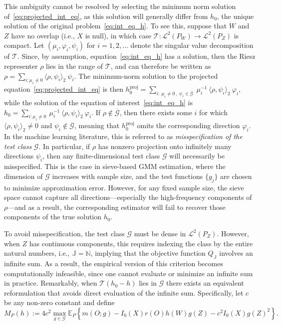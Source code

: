 \documentclass[twoside,11pt]{article}
\newcommand{\mc}{\mathcal}
\begin{document}
This ambiguity cannot be resolved by selecting the minimum norm solution of~\eqref{eq:projected_int_eq}, as this solution will generally differ from $h_0$, the unique solution of the original problem~\eqref{eq:int_eq_h}. To see this, suppose that $W$ and $Z$ have no overlap (i.e., $X$ is null), in which case $\mathcal{T}:\mc{L}^2(P_W) \rightarrow \mc{L}^2(P_Z)$ is compact. Let $(\mu_i, \varphi_i, \psi_i)$ for $i = 1, 2, \dots$ denote the singular value decomposition of $\mathcal{T}$. Since, by assumption, equation~\eqref{eq:int_eq_h} has a solution, then the Riesz representer $\rho$ lies in the range of $\mathcal{T}$, and can therefore be written as
$ 
\rho = \sum_{i:\mu_i \neq 0} \langle \rho, \psi_i \rangle_2 \: \psi_i$.
The minimum-norm solution to the projected equation~\eqref{eq:projected_int_eq} is then $ 
h_0^{\text{proj}} = \sum_{i:\: \mu_i \neq 0 \:,\: \psi_i \in \overline{\mathcal{G}}} \: \mu_i^{-1} \:{\langle \rho, \psi_i \rangle_2} \: \varphi_i$, 
while the solution of the equation of interest~\eqref{eq:int_eq_h} is $ 
h_0 = \sum_{i: \mu_i \neq 0}\: \mu_i^{-1} \:{\langle \rho, \psi_i \rangle_2} \:\varphi_i $.
If $\rho \notin \overline{\mathcal{G}}$, then there exists some $i$ for which $\langle \rho, \psi_i \rangle_2 \neq 0$ and $\psi_i \notin \overline{\mathcal{G}}$, meaning that $h_0^{\text{proj}}$ omits the corresponding direction $\varphi_i$. In the machine learning literature, this is referred to as \textit{misspecification of the test class} $\mathcal{G}$. In particular, if $\rho$ has nonzero projection onto infinitely many directions $\psi_i$, then any finite-dimensional test class $\mathcal{G}$ will necessarily be misspecified. This is the case in sieve-based GMM estimation, where the dimension of $\mathcal{G}$ increases with sample size, and the test functions $\{g_j\}$ are chosen to minimize approximation error. However, for any fixed sample size, the sieve space cannot capture all directions—especially the high-frequency components of $\rho$—and as a result, the corresponding estimator will fail to recover those components of the true solution $h_0$.


To avoid misspecification, the test class $\mathcal{G}$ must be dense in $\mathcal{L}^2(P_Z)$. However, when $Z$ has continuous components, this requires indexing the class by the entire natural numbers, i.e., $\mathbb{J} = \mathbb{N}$, implying that the objective function $Q_{\mathbb{J}}$ involves an infinite sum. As a result, the empirical version of this criterion becomes computationally infeasible, since one cannot evaluate or minimize an infinite sum in practice. Remarkably, when $\mc{T}(h_0-h)$ lies in $\mc{G}$ there exists an equivalent reformulation that avoids direct evaluation of the infinite sum. Specifically, let $c$ be any non-zero constant and define
\[
M_P(h) := 4c^2 \max_{g\in \mc{G}} \mathbb{E}_P\left\{m(O;g)-I_0(X)r(O)h(W)g(Z)-c^2I_0(X)g(Z)^2\right\}.
\]
\end{document}
